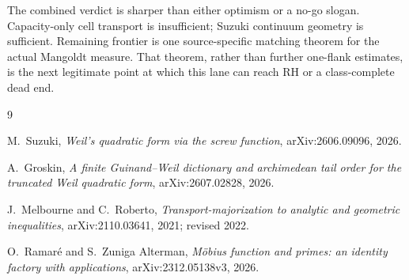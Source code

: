 \documentclass[11pt]{article}
\begin{document}
The combined verdict is sharper than either optimism or a no-go slogan.  Capacity-only cell
transport is insufficient; Suzuki continuum geometry is sufficient.  Remaining frontier is one
source-specific matching theorem for the actual Mangoldt measure.  That theorem, rather than
further one-flank estimates, is the next legitimate point at which this lane can reach RH or a
class-complete dead end.

\begin{thebibliography}{9}

M.~Suzuki,
\emph{Weil's quadratic form via the screw function},
arXiv:2606.09096, 2026.

A.~Groskin,
\emph{A finite Guinand--Weil dictionary and archimedean tail order for the truncated Weil
quadratic form},
arXiv:2607.02828, 2026.

J.~Melbourne and C.~Roberto,
\emph{Transport-majorization to analytic and geometric inequalities},
arXiv:2110.03641, 2021; revised 2022.

O.~Ramar\'e and S.~Zuniga Alterman,
\emph{M\"obius function and primes: an identity factory with applications},
arXiv:2312.05138v3, 2026.

\end{thebibliography}
\end{document}
